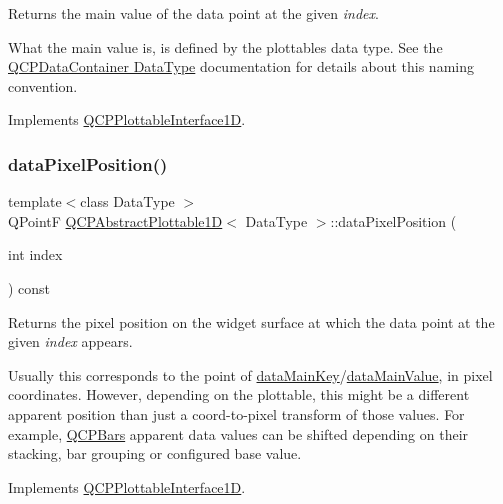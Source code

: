 Returns the main value of the data point at the given {\itshape index}.

What the main value is, is defined by the plottable\textquotesingle{}s data type. See the \hyperlink{classQCPDataContainer_qcpdatacontainer-datatype}{Q\+C\+P\+Data\+Container Data\+Type} documentation for details about this naming convention. 

Implements \hyperlink{classQCPPlottableInterface1D_af6330919e8023277d08c958a6074fc76}{Q\+C\+P\+Plottable\+Interface1D}.

\mbox{\label{classQCPAbstractPlottable1D_a6ca0699a6af5f25a7565de7c50ce13b2}} 
\subsubsection{\texorpdfstring{data\+Pixel\+Position()}{dataPixelPosition()}}
{\footnotesize\ttfamily template$<$class Data\+Type $>$ \\
Q\+PointF \hyperlink{classQCPAbstractPlottable1D}{Q\+C\+P\+Abstract\+Plottable1D}$<$ Data\+Type $>$\+::data\+Pixel\+Position (\begin{DoxyParamCaption}\item[{int}]{index }\end{DoxyParamCaption}) const\hspace{0.3cm}{\ttfamily [virtual]}}





Returns the pixel position on the widget surface at which the data point at the given {\itshape index} appears.

Usually this corresponds to the point of \hyperlink{classQCPAbstractPlottable1D_aeb156ebf5d3c8de906b428be30733ad8}{data\+Main\+Key}/\hyperlink{classQCPAbstractPlottable1D_a6be0f657ba85a1688336d76ad649ecf2}{data\+Main\+Value}, in pixel coordinates. However, depending on the plottable, this might be a different apparent position than just a coord-\/to-\/pixel transform of those values. For example, \hyperlink{classQCPBars}{Q\+C\+P\+Bars} apparent data values can be shifted depending on their stacking, bar grouping or configured base value. 

Implements \hyperlink{classQCPPlottableInterface1D_a78911838cfbcfd2d8df9ad2fdbfb8e93}{Q\+C\+P\+Plottable\+Interface1D}.



